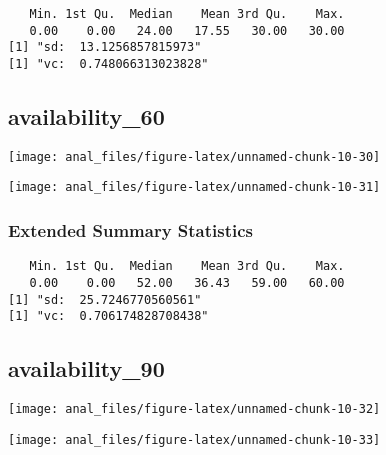 \begin{verbatim}   Min. 1st Qu.  Median    Mean 3rd Qu.    Max. 
   0.00    0.00   24.00   17.55   30.00   30.00 
[1] "sd:  13.1256857815973"
[1] "vc:  0.748066313023828"
\end{verbatim}

\pagebreak

\centering

\hypertarget{availability_60}{%
\subsection{availability\_60}\label{availability_60}}

\begin{center}\texttt{[image: anal\_files/figure-latex/unnamed-chunk-10-30]} \end{center}

\begin{center}\texttt{[image: anal\_files/figure-latex/unnamed-chunk-10-31]} \end{center}

\hypertarget{extended-summary-statistics-8}{%
\subsubsection{Extended Summary
Statistics}\label{extended-summary-statistics-8}}

\begin{verbatim}   Min. 1st Qu.  Median    Mean 3rd Qu.    Max. 
   0.00    0.00   52.00   36.43   59.00   60.00 
[1] "sd:  25.7246770560561"
[1] "vc:  0.706174828708438"
\end{verbatim}

\pagebreak

\centering

\hypertarget{availability_90}{%
\subsection{availability\_90}\label{availability_90}}

\begin{center}\texttt{[image: anal\_files/figure-latex/unnamed-chunk-10-32]} \end{center}

\begin{center}\texttt{[image: anal\_files/figure-latex/unnamed-chunk-10-33]} \end{center}

